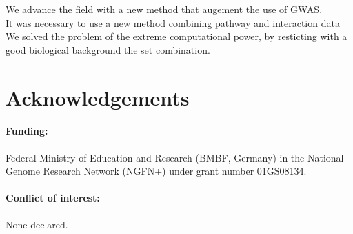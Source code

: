 \documentclass[citeauthoryear]{llncs}
\begin{document}
We advance the field with a new method that augement the use of GWAS.\\
It was necessary to use a new method combining pathway and interaction data\\
We solved the problem of the extreme computational power, by resticting with a good biological background the set combination.\\



\section*{Acknowledgements}
\paragraph{Funding:}
Federal Ministry of Education and Research (BMBF, Germany) in the National
Genome Research Network (NGFN+) under grant number 01GS08134.
\paragraph{Conflict of interest:} None declared.


%
%
\end{document}
